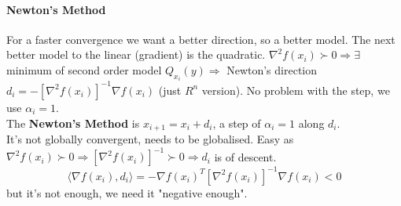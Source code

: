 \documentclass[10pt]{report}
\begin{document}
\paragraph{Newton's Method} For a faster convergence we want a better direction, so a better model. The next better model to the linear (gradient) is the quadratic. $\nabla^2 f(x_i)\succ 0 \Rightarrow \exists$ minimum of second order model $Q_{x_i}(y)\Rightarrow$ Newton's direction $d_i = -[\nabla^2 f(x_i)]^{-1}\nabla f(x_i)$ (just $R^n$ version). No problem with the step, we use $\alpha_i = 1$.\\
The \textbf{Newton's Method} is $x_{i+1} = x_i + d_i$, a step of $\alpha_i = 1$ along $d_i$.\\
It's not globally convergent, needs to be globalised. Easy as $\nabla^2 f(x_i) \succ 0 \Rightarrow [\nabla^2 f(x_i)]^{-1} \succ 0 \Rightarrow d_i$ is of descent.
$$\langle \nabla f(x_i), d_i\rangle = -\nabla f(x_i)^T[\nabla^2f(x_i)]^{-1}\nabla f(x_i) < 0$$
but it's not enough, we need it "negative enough".
\end{document}
